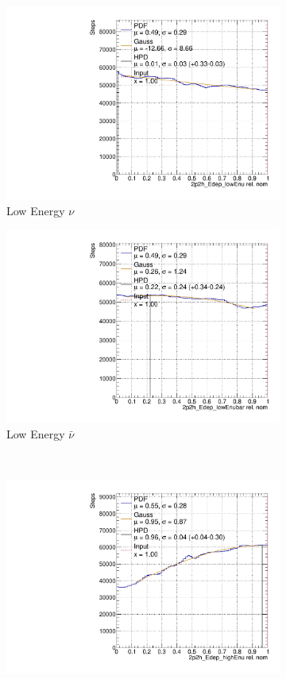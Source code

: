 \begin{figure}
\centering
\begin{subfigure}{.48\textwidth}
  \centering
  \includegraphics[width=0.73\linewidth]{figs/2p2h_Edep_lowEnu.pdf}
  \caption{Low Energy $\nu$}
\end{subfigure}
\begin{subfigure}{.48\textwidth}
  \centering
  \includegraphics[width=0.73\linewidth]{figs/2p2h_Edep_lowEnubar.pdf}
  \caption{Low Energy $\bar{\nu}$}
\end{subfigure} \\
\begin{subfigure}{.48\textwidth}
  \centering
  \includegraphics[width=0.73\linewidth]{figs/2p2h_Edep_highEnu.pdf}

\end{subfigure}
\end{figure}
